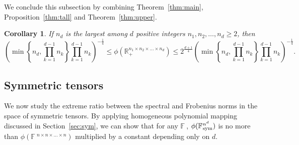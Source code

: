 \documentclass[11pt]{article}
\newtheorem{corollary}[theorem]{Corollary}
\newcommand{\R}{\mathbb{R}}
\newcommand{\BF}{\mathbb{F}\:\!}
\newcommand{\sym}{\textnormal{sym}}
\begin{document}
We conclude this subsection by combining Theorem~\ref{thm:main}, Proposition~\ref{thm:tall} and Theorem~\ref{thm:upper}.
\begin{corollary}\label{thm:upper2}
    If $n_d$ is the largest among $d$ positive integers $n_1,n_2,\dots,n_d\ge2$, then
  $$
    \left(\min\left\{n_d,\prod_{k=1}^{d-1} n_k\right\}\prod_{k=1}^{d-1} n_k\right)^{-\frac{1}{4}}
    \le \phi(\R_+^{n_1\times n_2\times\dots\times n_d})
    \le 2^{\frac{d+1}{4}}\left(\min\left\{n_d,\prod_{k=1}^{d-1} n_k\right\}\prod_{k=1}^{d-1} n_k\right)^{-\frac{1}{4}}.
  $$
\end{corollary}

\subsection{Symmetric tensors}\label{sec:symmetric}

We now study the extreme ratio between the spectral and Frobenius norms in the space of symmetric tensors. By applying homogeneous polynomial mapping discussed in Section~\ref{sec:sym}, we can show that for any $\BF$, $\phi(\BF^{n^d}_\sym)$ is no more than $\phi(\BF^{n\times n\times \dots\times n})$ multiplied by a constant depending only on $d$.
\end{document}
